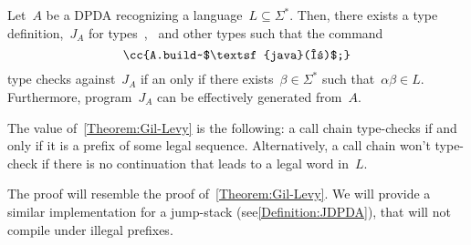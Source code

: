 \begin{theorem}\label{Theorem:Gil-Levy:2}
  Let~$A$ be a DPDA recognizing a language~$L⊆Σ^*$.
  Then, there exists a \Java type definition,~$J_A$ for types~,~ and
    other types such that the \Java command
  \begin{equation}
    \label{Equation:result}
    \cc{A.build~$\textsf{java}(α)$;}
  \end{equation}
  type checks against~$J_A$ if an only if there exists~$β∈Σ^*$ such
  that~$αβ∈L$.
  Furthermore, program~$J_A$ can be effectively generated from~$A$.
\end{theorem}

The value of~\cref{Theorem:Gil-Levy} is the following:
  a call chain type-checks if and only if it is a prefix
  of some legal sequence.
Alternatively, a call chain won't type-check if there is no
  continuation that leads to a legal word in~$L$.

The proof will resemble the proof of~\cref{Theorem:Gil-Levy}.
  We will provide a similar implementation for a jump-stack (see\cref{Definition:JDPDA}),
  that will not compile under illegal prefixes.
